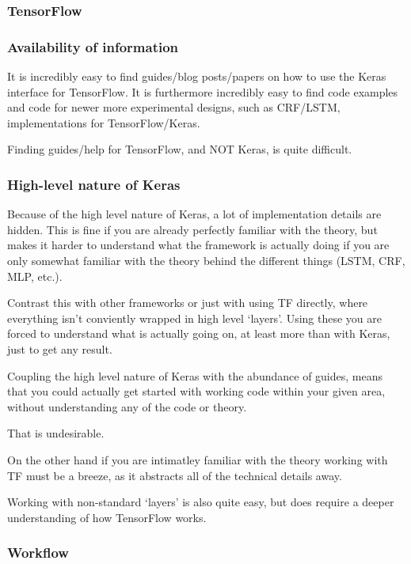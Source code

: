\subsubsection{TensorFlow}

\subsubsection*{Availability of information}

It is incredibly easy to find guides/blog posts/papers on how to use the Keras
interface for TensorFlow. It is furthermore incredibly easy to find code
examples and code for newer more experimental designs, such as CRF/LSTM,
implementations for TensorFlow/Keras.

Finding guides/help for TensorFlow, and NOT Keras, is quite difficult.

\subsubsection*{High-level nature of Keras}

Because of the high level nature of Keras, a lot of implementation details are
hidden. This is fine if you are already perfectly familiar with the theory, but
makes it harder to understand what the framework is actually doing if you are
only somewhat familiar with the theory behind the different things  (LSTM, CRF,
MLP, etc.).

Contrast this with other frameworks or just with using TF directly, where
everything isn't conviently wrapped in high level `layers'. Using these you are
forced to understand what is actually going on, at least more than with Keras,
just to get any result.

Coupling the high level nature of Keras with the abundance of guides, means that
you could actually get started with working code within your given area, without
understanding any of the code or theory.

That is undesirable.

On the other hand if you are intimatley familiar with the theory working with TF
must be a breeze, as it abstracts all of the technical details away.

Working with non-standard `layers' is also quite easy, but does require a deeper
understanding of how TensorFlow works.

\subsubsection*{Workflow}

